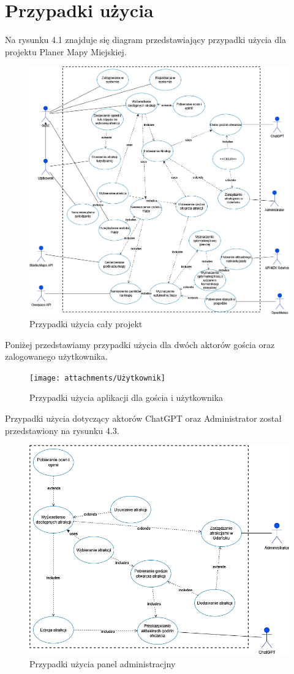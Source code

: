     \newpage
\section{Przypadki użycia}
\label{sec:przypadki-uzycia}
Na rysunku 4.1 znajduje się diagram przedstawiający przypadki użycia dla projektu Planer Mapy Miejskiej.
\begin{figure}[H]
    \centering
    \includegraphics[width=1\textwidth]{attachments/Przypadki_Uzycia-final}
    \caption{Przypadki użycia cały projekt}
    \label{fig:przypadki-uzycia1}
    \end{figure}
Poniżej przedstawiamy przypadki użycia dla dwóch aktorów gościa oraz zalogowanego użytkownika.


    \begin{figure}[H]
        \centering
        \texttt{[image: attachments/Użytkownik]}
        \caption{Przypadki użycia aplikacji dla gościa i użytkownika}
        \label{fig:przypadki-uzycia2}
        \end{figure}

Przypadki użycia dotyczący aktorów ChatGPT oraz Administrator został przedstawiony na rysunku 4.3.

\begin{figure}[H]
    \centering
    \includegraphics[width=1\textwidth]{attachments/admin}
    \caption{Przypadki użycia panel administracjny}
    \label{fig:przypadki-uzycia3}
    \end{figure}